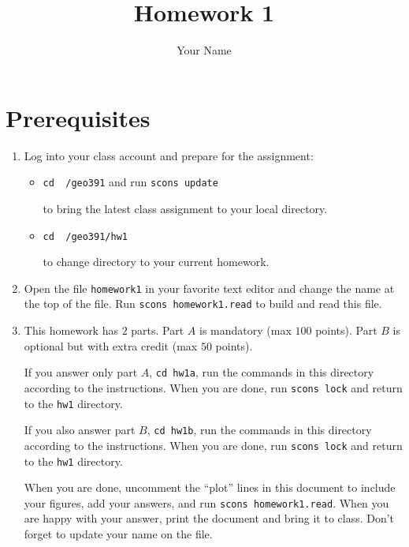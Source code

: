 \author{Your Name}
\title{Homework 1}

\shortpaper
\maketitle




\section{Prerequisites}

\begin{enumerate}
\item Log into your class account and prepare for the assignment:

\begin{itemize}
\item \texttt{cd ~/geo391} and run \texttt{scons update} \par
to bring the latest class assignment to your local directory.
\item \texttt{cd ~/geo391/hw1} \par
to change directory to your current homework.
\end{itemize}

\item Open the file \texttt{homework1} in your favorite text editor
and change the name at the top of the file.
Run \texttt{scons homework1.read} to build and read this file.

\item This homework has $2$ parts. 
Part $A$ is mandatory (max $100$ points).
Part $B$ is optional but with extra credit (max $50$ points).

If you answer only part $A$, \texttt{cd hw1a},
run the commands in this directory according to the 
instructions. When you are done, run \texttt{scons lock} and
return to the \texttt{hw1} directory.

If you also answer part $B$, \texttt{cd hw1b},
run the commands in this directory according to the 
instructions. When you are done, run \texttt{scons lock} and
return to the \texttt{hw1} directory.

When you are done, uncomment the ``plot'' lines in this document
to include your figures, add your answers, and run
\texttt{scons homework1.read}. 
When you are happy with your answer, print the document and
bring it to class. Don't forget to update your name on the file.

\end{enumerate}

